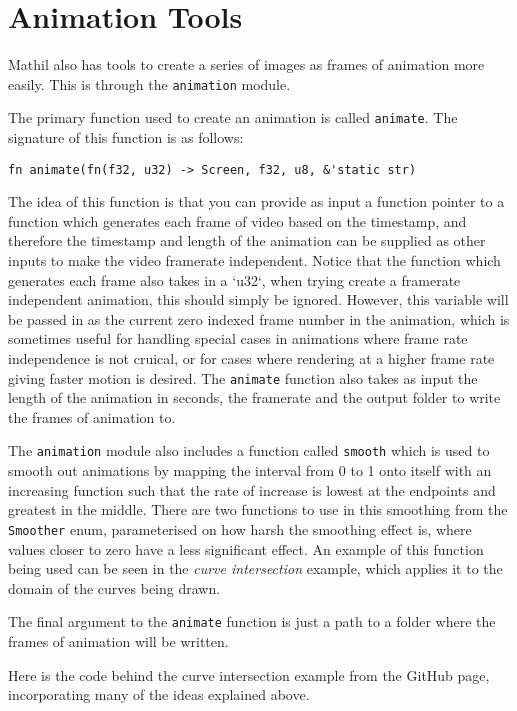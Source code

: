 \section{Animation Tools}

Mathil also has tools to create a series of images as frames of animation more easily. This is through the \verb|animation| module.

The primary function used to create an animation is called \verb|animate|. The signature of this function is as follows:

\begin{lstlisting}
fn animate(fn(f32, u32) -> Screen, f32, u8, &'static str)
\end{lstlisting}

The idea of this function is that you can provide as input a function pointer to a function which generates each frame of video based on the timestamp, and therefore the timestamp and length of the animation can be supplied as other inputs to make the video framerate independent. Notice that the function which generates each frame also takes in a `u32`, when trying create a framerate independent animation, this should simply be ignored. However, this variable will be passed in as the current zero indexed frame number in the animation, which is sometimes useful for handling special cases in animations where frame rate independence is not cruical, or for cases where rendering at a higher frame rate giving faster motion is desired. The \verb|animate| function also takes as input the length of the animation in seconds, the framerate and the output folder to write the frames of animation to.

The \verb|animation| module also includes a function called \verb|smooth| which is used to smooth out animations by mapping the interval from 0 to 1 onto itself with an increasing function such that the rate of increase is lowest at the endpoints and greatest in the middle. There are two functions to use in this smoothing from the \verb|Smoother| enum, parameterised on how harsh the smoothing effect is, where values closer to zero have a less significant effect. An example of this function being used can be seen in the \emph{curve intersection} example, which applies it to the domain of the curves being drawn.

The final argument to the \verb|animate| function is just a path to a folder where the frames of animation will be written.

Here is the code behind the curve intersection example from the GitHub page, incorporating many of the ideas explained above.

